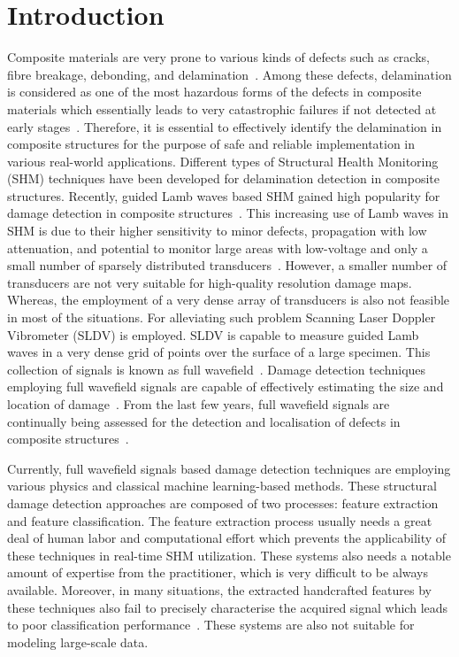 \section{Introduction}
Composite materials are very prone to various kinds of defects such as cracks, fibre  breakage, debonding, and delamination~\cite{ip2004delamination, smith2009composite}. Among these defects, delamination is considered as one of the most hazardous forms of the defects in composite materials which essentially leads to very catastrophic failures if not detected at early stages~\cite{valdes1999delamination}. 
Therefore, it is essential to effectively identify the delamination in composite structures for the purpose of safe and reliable implementation in various real-world applications. 
Different types of Structural Health Monitoring (SHM) techniques have been developed for delamination detection in composite structures. 
Recently, guided Lamb waves based SHM gained high popularity for damage detection in composite structures~\cite{mitra2016guided}. 
This increasing use of Lamb waves in SHM is due to their higher sensitivity to minor defects, propagation with low attenuation, and potential to monitor large areas with low-voltage and only a small number of sparsely distributed transducers~\cite{alleyne1992interaction, giurgiutiu2003lamb, ihn2008pitch, mitra2016guided}. However, a smaller number of transducers are not very suitable for high-quality resolution damage maps. Whereas, the employment of a very dense array of transducers is also not feasible in most of the situations. For alleviating such problem Scanning Laser Doppler Vibrometer (SLDV) is employed. SLDV is capable to measure guided Lamb waves in a very dense grid of points over the surface of a large specimen. This collection of signals is known as full wavefield~\cite{radzienski2019damage}. Damage detection techniques employing full wavefield signals are capable of effectively estimating the size and location of damage~\cite{girolamo2018impact, kudela2018impact}. From the last few years, full wavefield signals are continually being assessed for the detection and localisation of defects in composite structures~\cite{sohn2011delamination, sohn2011automated, rogge2013characterization, kudela2018impact, radzienski2019damage}.

Currently, full wavefield signals based damage detection techniques are employing various physics and classical machine learning-based methods. These structural damage detection approaches are composed of two processes: feature extraction and feature classification. The feature extraction process usually needs a great deal of human labor and computational effort which prevents the applicability of these techniques in real-time SHM utilization. These systems also needs a notable amount of expertise from the practitioner, which is very difficult to be always available. Moreover, in many situations, the extracted handcrafted features by these techniques also fail to precisely characterise the acquired signal which leads to poor classification performance~\cite{zhao2019deep, yuan2020machine}. These systems are also not suitable for modeling large-scale data.

